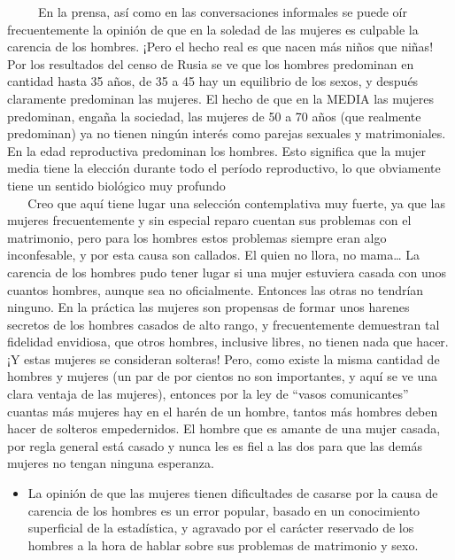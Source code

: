 ~ ~ ~ En la prensa, así como en las conversaciones informales se puede
oír frecuentemente la opinión de que en la soledad de las mujeres es
culpable la carencia de los hombres. ¡Pero el hecho real es que nacen
más niños que niñas! Por los resultados del censo de Rusia se ve que los
hombres predominan en cantidad hasta 35 años, de 35 a 45 hay un
equilibrio de los sexos, y después claramente predominan las mujeres. El
hecho de que en la MEDIA las mujeres predominan, engaña la sociedad, las
mujeres de 50 a 70 años (que realmente predominan) ya no tienen ningún
interés como parejas sexuales y matrimoniales. En la edad reproductiva
predominan los hombres. Esto significa que la mujer media tiene la
elección durante todo el período reproductivo, lo que obviamente tiene
un sentido biológico muy profundo\\
\hspace*{0.333em} ~ ~ Creo que aquí tiene lugar una selección
contemplativa muy fuerte, ya que las mujeres frecuentemente y sin
especial reparo cuentan sus problemas con el matrimonio, pero para los
hombres estos problemas siempre eran algo inconfesable, y por esta causa
son callados. El quien no llora, no mama\ldots{} La carencia de los
hombres pudo tener lugar si una mujer estuviera casada con unos cuantos
hombres, aunque sea no oficialmente. Entonces las otras no tendrían
ninguno. En la práctica las mujeres son propensas de formar unos harenes
secretos de los hombres casados de alto rango, y frecuentemente
demuestran tal fidelidad envidiosa, que otros hombres, inclusive libres,
no tienen nada que hacer. ¡Y estas mujeres se consideran solteras! Pero,
como existe la misma cantidad de hombres y mujeres (un par de por
cientos no son importantes, y aquí se ve una clara ventaja de las
mujeres), entonces por la ley de ``vasos comunicantes'' cuantas más
mujeres hay en el harén de un hombre, tantos más hombres deben hacer de
solteros empedernidos. El hombre que es amante de una mujer casada, por
regla general está casado y nunca les es fiel a las dos para que las
demás mujeres no tengan ninguna esperanza.

\begin{itemize}
\tightlist
\item
  La opinión de que las mujeres tienen dificultades de casarse por la
  causa de carencia de los hombres es un error popular, basado en un
  conocimiento superficial de la estadística, y agravado por el carácter
  reservado de los hombres a la hora de hablar sobre sus problemas de
  matrimonio y sexo.
\end{itemize}

